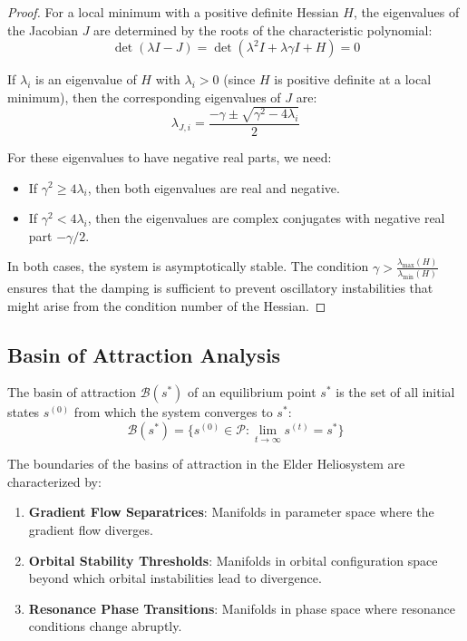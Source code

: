 \begin{proof}
For a local minimum with a positive definite Hessian $H$, the eigenvalues of the Jacobian $J$ are determined by the roots of the characteristic polynomial:
\begin{equation}
\det(\lambda I - J) = \det\left(\lambda^2 I + \lambda \gamma I + H\right) = 0
\end{equation}

If $\lambda_i$ is an eigenvalue of $H$ with $\lambda_i > 0$ (since $H$ is positive definite at a local minimum), then the corresponding eigenvalues of $J$ are:
\begin{equation}
\lambda_{J,i} = \frac{-\gamma \pm \sqrt{\gamma^2 - 4\lambda_i}}{2}
\end{equation}

For these eigenvalues to have negative real parts, we need:
\begin{itemize}
    \item If $\gamma^2 \geq 4\lambda_i$, then both eigenvalues are real and negative.
    \item If $\gamma^2 < 4\lambda_i$, then the eigenvalues are complex conjugates with negative real part $-\gamma/2$.
\end{itemize}

In both cases, the system is asymptotically stable. The condition $\gamma > \frac{\lambda_{\max}(H)}{\lambda_{\min}(H)}$ ensures that the damping is sufficient to prevent oscillatory instabilities that might arise from the condition number of the Hessian.
\end{proof}

\subsection{Basin of Attraction Analysis}

\begin{definition}
The basin of attraction $\mathcal{B}(s^*)$ of an equilibrium point $s^*$ is the set of all initial states $s^{(0)}$ from which the system converges to $s^*$:
\begin{equation}
\mathcal{B}(s^*) = \{s^{(0)} \in \mathcal{P} : \lim_{t \to \infty} s^{(t)} = s^*\}
\end{equation}
\end{definition}

\begin{theorem}
The boundaries of the basins of attraction in the Elder Heliosystem are characterized by:
\begin{enumerate}
    \item \textbf{Gradient Flow Separatrices}: Manifolds in parameter space where the gradient flow diverges.
    \item \textbf{Orbital Stability Thresholds}: Manifolds in orbital configuration space beyond which orbital instabilities lead to divergence.
    \item \textbf{Resonance Phase Transitions}: Manifolds in phase space where resonance conditions change abruptly.
\end{enumerate}
\end{theorem}

